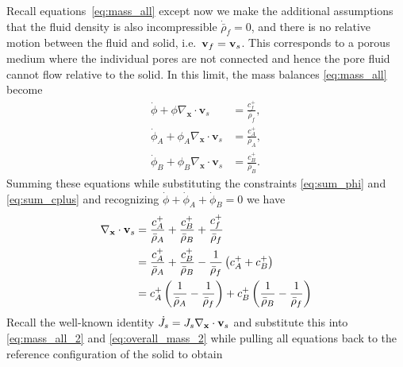\documentclass[11pt]{article}
\begin{document}
Recall equations~\eqref{eq:mass_all} except now we make the additional assumptions that the fluid density is also incompressible $\dot{\bar{\rho}}_f = 0$, and there is no relative motion between the fluid and solid, i.e.\ $\mathbf{v}_f = \mathbf{v}_s$. This corresponds to a porous medium where the individual pores are not connected and hence the pore fluid cannot flow relative to the solid. In this limit, the mass balances \eqref{eq:mass_all} become
%
\begin{subequations}
\begin{align}
  \dot{\phi}  + \phi \nabla_{\mathbf{x}} \cdot \mathbf{v}_s &= \frac{c^{+}_f}{\bar\rho_f}, \label{eq:mass_f_2} \\
  \dot{\phi}_A + \phi_A \nabla_{\mathbf{x}} \cdot \mathbf{v}_s &= \frac{c^{+}_A}{\bar\rho_A}, \label{eq:mass_A_2} \\
  \dot{\phi}_B + \phi_B \nabla_{\mathbf{x}} \cdot \mathbf{v}_s &= \frac{c^{+}_B}{\bar\rho_B}. \label{eq:mass_B_2}
\end{align}
  \label{eq:mass_all_2}
\end{subequations}
%
Summing these equations while substituting the constraints \eqref{eq:sum_phi} and \eqref{eq:sum_cplus} and recognizing $\dot{\phi} + \dot{\phi}_A + \dot{\phi}_B = 0$ we have
%
\begin{align}
  \nabla_{\mathbf{x}} \cdot \mathbf{v}_s &= \frac{c^{+}_A}{\bar{\rho}_A} + \frac{c^{+}_B}{\bar{\rho}_B} + \frac{c^{+}_f}{\bar{\rho}_f} \notag \\
  &= \frac{c^{+}_A}{\bar{\rho}_A} + \frac{c^{+}_B}{\bar{\rho}_B} - \frac{1}{\bar{\rho}_f}\left(c^{+}_A + c^{+}_B\right) \notag \\
  &= c^{+}_A\left(\frac{1}{\bar{\rho}_A} - \frac{1}{\bar{\rho}_f}\right) + c^{+}_B\left(\frac{1}{\bar{\rho}_B} - \frac{1}{\bar{\rho}_f}\right)
  \label{eq:overall_mass_2}
\end{align}
%
Recall the well-known identity $\dot{J}_s = J_s \nabla_{\mathbf{x}} \cdot \mathbf{v}_s$ and substitute this into \eqref{eq:mass_all_2} and \eqref{eq:overall_mass_2} while pulling all equations back to the reference configuration of the solid to obtain
\end{document}
